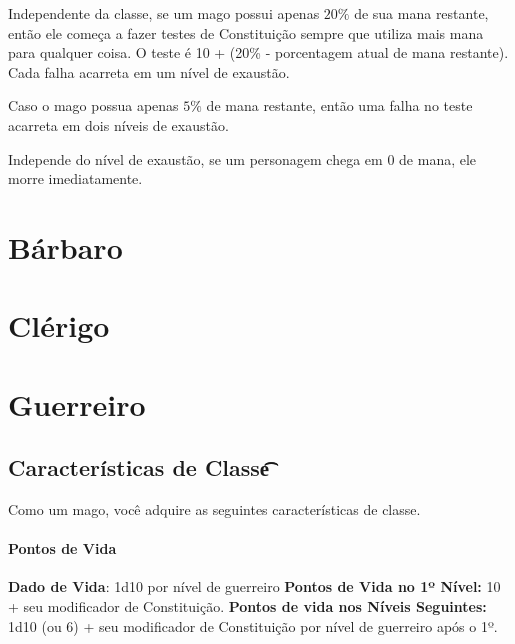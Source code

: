 \documentclass{RPG_Adventure}[2021/10/20]
\begin{document}
Independente da classe, se um mago possui apenas $20\%$ de sua mana restante,
então ele começa a fazer testes de Constituição sempre que utiliza mais mana
para qualquer coisa. O teste é 10 + (20\% - porcentagem atual de mana restante).
Cada falha acarreta em um nível de exaustão.

Caso o mago possua apenas $5\%$ de mana restante, então uma falha no teste
acarreta em dois níveis de exaustão.

Independe do nível de exaustão, se um personagem chega em $0$ de mana, ele
morre imediatamente.


\chapter{Bárbaro}%
\label{cha:barbaro}


\chapter{Clérigo}%
\label{cha:clerigo}


\chapter{Guerreiro}%
\label{cha:guerreiro}

\section*{Características de Classe\t\t}%
\label{sec:caracteristicas_de_classe}

Como um mago, você adquire as seguintes características de classe.

\subsubsection{Pontos de Vida}%
\label{ssub:pontos_de_vida}

\textbf{Dado de Vida}: 1d10 por nível de guerreiro \nl
\textbf{Pontos de Vida no 1º Nível:} 10 + seu modificador de Constituição. \nl
\textbf{Pontos de vida nos Níveis Seguintes:} 1d10 (ou 6) + seu modificador de
Constituição por nível de guerreiro após o 1º.
\end{document}
